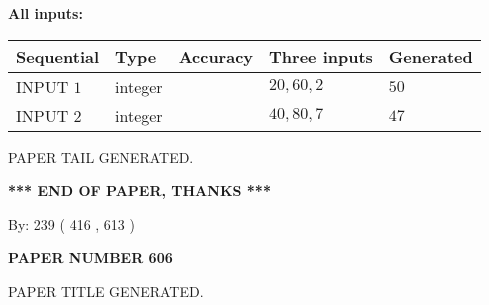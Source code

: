 \documentclass[12pt]{article}
\begin{document}
   
   
   
\noindent\vspace{0.1in}\hspace{-0.08in} {\textbf{\Large{All inputs: }}}
   
   
  
  
\noindent\begin{tabular}{|l|l|l|l|l|}
\hline
 Sequential & Type & Accuracy & Three inputs & Generated \\ 
\hline
 
 
  INPUT $  1 $ & integer &  & $
 20
 , 
 60
 , 
 2
 $ & $ 50 $ 
 \\  \hline  
 
 
  INPUT $  2 $ & integer &  & $
 40
 , 
 80
 , 
 7
 $ & $ 47 $ 
 \\  \hline  
 \end{tabular}
   
   
   
   
   
   
 \vspace{0.2in}
 
   
   
\vspace{2.0in} PAPER TAIL GENERATED.
   
   
   
   
\vspace{1.0in} 
{\textbf{\large{ *** END OF PAPER, THANKS *** }}} 
   
   
\hspace{1.0in} By: 
 239 ( 416 ,  613 )
   
   
   
   
\newpage 
\setcounter{page}{ 
   606001 } 
   
   
   
   
 {\textbf{ \Large{ PAPER NUMBER  606  }}}
   
   
\vspace{0.2in}
   
   
   
   
   
   
   
   
 \vspace{0.2in}
 
 
 
 
   
   
 PAPER TITLE GENERATED.
   
   
   
\vspace{0.2in}
   
\end{document}
